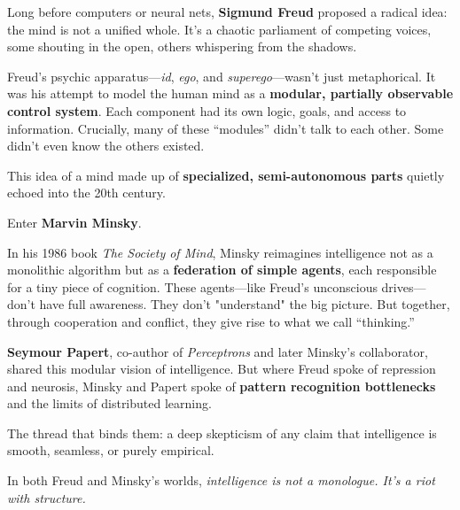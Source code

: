 \begin{tcolorbox}[sidebarstyle, title={Freud and the Modular Mind}]
  Long before computers or neural nets, \textbf{Sigmund Freud} proposed a radical idea: the mind is not a unified whole. It's a chaotic parliament of competing voices, some shouting in the open, others whispering from the shadows.
  
  Freud’s psychic apparatus—\emph{id}, \emph{ego}, and \emph{superego}—wasn’t just metaphorical. It was his attempt to model the human mind as a \textbf{modular, partially observable control system}. Each component had its own logic, goals, and access to information. Crucially, many of these “modules” didn’t talk to each other. Some didn’t even know the others existed.
  
  This idea of a mind made up of \textbf{specialized, semi-autonomous parts} quietly echoed into the 20th century.
  
  Enter \textbf{Marvin Minsky}.
  
  In his 1986 book \emph{The Society of Mind}, Minsky reimagines intelligence not as a monolithic algorithm but as a \textbf{federation of simple agents}, each responsible for a tiny piece of cognition. These agents—like Freud’s unconscious drives—don’t have full awareness. They don’t "understand" the big picture. But together, through cooperation and conflict, they give rise to what we call “thinking.”
  
  \textbf{Seymour Papert}, co-author of \emph{Perceptrons} and later Minsky’s collaborator, shared this modular vision of intelligence. But where Freud spoke of repression and neurosis, Minsky and Papert spoke of \textbf{pattern recognition bottlenecks} and the limits of distributed learning. 
  
  The thread that binds them: a deep skepticism of any claim that intelligence is smooth, seamless, or purely empirical.
  
  \medskip
  In both Freud and Minsky’s worlds, \textit{intelligence is not a monologue. It’s a riot with structure.}
\end{tcolorbox}


